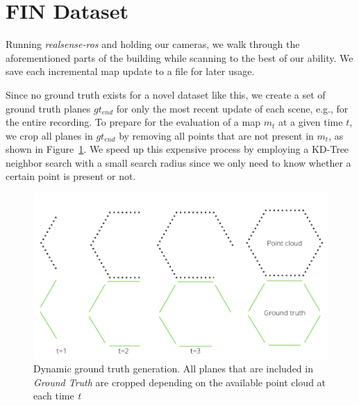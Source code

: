 \documentclass[main.tex]{subfiles}
\begin{document}
\section{FIN Dataset}
\label{sec:finimpl}

Running \textit{realsense-ros} and holding our cameras, we walk through the aforementioned parts of the building while scanning to the best of our ability.
We save each incremental map update to a file for later usage.

Since no ground truth exists for a novel dataset like this, we create a set of ground truth planes $gt_{end}$ for only the most recent update of each scene, e.g., for the entire recording.
To prepare for the evaluation of a map $m_t$ at a given time $t$, we crop all planes in $gt_{end}$ by removing all points that are not present in $m_t$, as shown in
Figure~\ref{fig:dynGT}.
We speed up this expensive process by employing a KD-Tree neighbor search with a small search radius since we only need to know whether a certain point is present or not.
\begin{figure}[H]
    \centering
    \includegraphics[width=15 cm]{images/dynamic_eval.png}
    \caption[Dynamic Ground Truth Generation]{Dynamic ground truth generation. All planes that are included in \textit{Ground Truth} are cropped depending on
        the available point cloud at each time \textit{t} }
    \label{fig:dynGT}
\end{figure}
\end{document}
